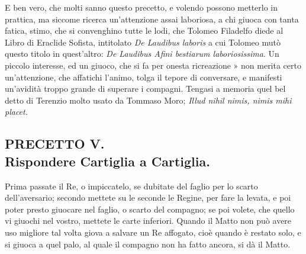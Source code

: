 \documentclass[11pt,a6paper]{article}
\begin{document}
{\footnotesize
E ben vero, che molti sanno questo precetto,
e volendo possono metterlo in prattica,
ma siccome ricerca un'attenzione assai
laboriosa, a chi giuoca con tanta fatica, stimo,
che si convenghino tutte le lodi, che Tolomeo
Filadelfo diede al Libro di Eraclide Sofista,
intitolato \textit{De Laudibus laboris} a cui Tolomeo
mutò questo titolo in quest'altro: \textit{De Laudibus Afini bestiarum laboriosissima}. Un piccolo
interesse, ed un giuoco, che si fa per
onesta ricreazione » non merita certo
un'attenzione, che affatichi l'animo, tolga il
tepore di conversare, e manifesti un'avidità
troppo grande di superare i compagni. Tengasi
a memoria quel bel detto di Terenzio
molto usato da Tommaso Moro; \textit{Illud nihil
nimis, nimis mihi placet}.
}

\subsection{PRECETTO V.\\
 \footnotesize Rispondere Cartiglia a Cartiglia.}

Prima passate il Re, o impiccatelo, se
dubitate del faglio per lo scarto dell'aversario;
secondo mettete su le seconde le
Regine, per fare la levata, e poi poter presto
giuocare nel faglio, o scarto del compagno;
se poi volete, che quello vi giuochi nel
vostro, mettete le carte inferiori. Quando il
Matto non può avere uso migliore tal volta
giova a salvare un Re affogato, cioè quando
è restato solo, e si giuoca a quel palo, al
quale il compagno non ha fatto ancora, si dà il Matto.
\end{document}
